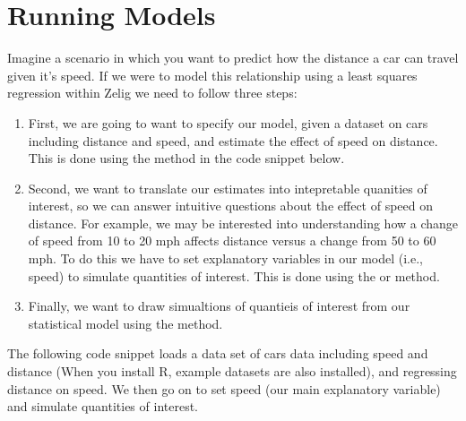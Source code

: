 \documentclass[letterpaper,10pt,english]{sphinxmanual}
\begin{document}
\section{Running Models}
\label{installation:running-models}
Imagine a scenario in which you want to predict how the distance a car can travel given it's speed. If we were to model this relationship using a least squares regression within Zelig we need to follow three steps:
\begin{enumerate}
\item {} 
First, we are going to want to specify our model, given a dataset on cars including distance and speed, and estimate the effect of speed on distance. This is done using the  method in the code snippet below.

\item {} 
Second, we want to translate our estimates into intepretable quanities of interest, so we can answer intuitive questions about the effect of speed on distance. For example, we may be interested into understanding how a change of speed from 10 to 20 mph affects distance versus a change from 50 to 60 mph. To do this we have to set explanatory variables in our model (i.e., speed) to simulate quantities of interest. This is done using the  or  method.

\item {} 
Finally, we want to draw simualtions of quantieis of interest from our statistical model using the  method.

\end{enumerate}

The following code snippet loads a data set of cars data including speed and distance (When you install R, example datasets are also installed), and regressing distance on speed. We then go on to set speed (our main explanatory variable) and simulate quantities of interest.
\end{document}
